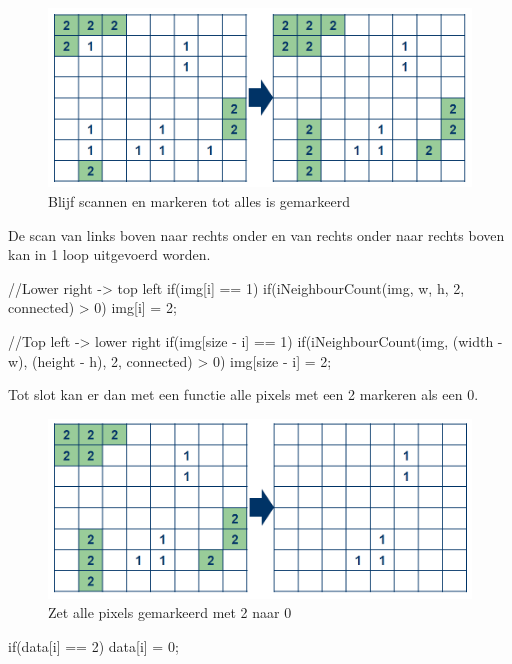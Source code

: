\begin{figure}
    \begin{center}
        \includegraphics[scale=0.35]{figures/border_blob_step2.png}
    \end{center}
    \caption{Blijf scannen en markeren tot alles is gemarkeerd}
    \label{fig:bbstep2}
\end{figure}

De scan van links boven naar rechts onder en van rechts onder naar rechts boven
kan in 1 loop uitgevoerd worden.

\begin{cppcode}
    //Lower right -> top left
    if(img[i] == 1){
        if(iNeighbourCount(img, w, h, 2, connected) > 0){
            img[i] = 2;
        }
    }

    //Top left -> lower right
    if(img[size - i] == 1){
        if(iNeighbourCount(img, (width - w), (height - h), 2, connected) > 0){
            img[size - i] = 2;
        }
    }
\end{cppcode}

Tot slot kan er dan met een functie alle pixels met een 2 markeren als een 0.

\begin{figure}
    \begin{center}
        \includegraphics[scale=0.35]{figures/border_blob_step3.png}
    \end{center}
    \caption{Zet alle pixels gemarkeerd met 2 naar 0}
    \label{fig:bbstep3}
\end{figure}


\begin{cppcode}
    if(data[i] == 2){
        data[i] = 0;
    }
\end{cppcode}
